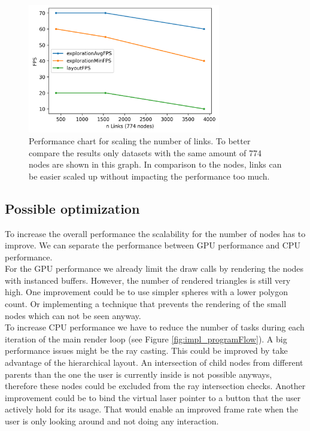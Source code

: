 \begin{figure}[!hbt]
    \centering
    \includegraphics[width=0.75\textwidth]{graphics/performanceAnalysisLinks.png}
    \caption{Performance chart for scaling the number of links. To better compare the results only datasets with the same amount of 774 nodes are shown in this graph. In comparison to the nodes, links can be easier scaled up without impacting the performance too much.} 
    \label{fig:performanceLinks} 
\end{figure}

\subsection{Possible optimization}

To increase the overall performance the scalability for the number of nodes has to improve. We can separate the performance between GPU performance and CPU performance.
\\
For the GPU performance we already limit the draw calls by rendering the nodes with instanced buffers.
However, the number of rendered triangles is still very high. 
One improvement could be to use simpler spheres with a lower polygon count. Or implementing a technique that prevents the rendering of the small nodes which can not be seen anyway.
\\
To increase CPU performance we have to reduce the number of tasks during each iteration of the main render loop (see Figure \ref{fig:impl_programFlow}).
A big performance issues might be the ray casting. This could be improved by take advantage of the hierarchical layout. An intersection of child nodes from different parents than the one the user is currently inside is not possible anyways, therefore these nodes could be excluded from the ray intersection checks. 
Another improvement could be to bind the virtual laser pointer to a button that the user actively hold for its usage. 
That would enable an improved frame rate when the user is only looking around and not doing any interaction. 

